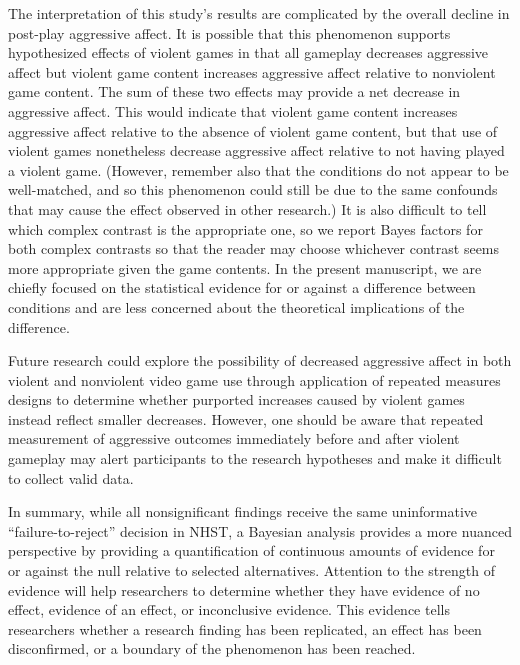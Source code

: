 \documentclass[man]{apa6}
\begin{document}

The interpretation of this study's results are complicated by the overall decline in post-play aggressive affect. It is possible that this phenomenon supports hypothesized effects of violent games in that all gameplay decreases aggressive affect but violent game content increases aggressive affect relative to nonviolent game content. The sum of these two effects may provide a net decrease in aggressive affect. This would indicate that violent game content increases aggressive affect relative to the absence of violent game content, but that use of violent games nonetheless decrease aggressive affect relative to not having played a violent game. (However, remember also that the conditions do not appear to be well-matched, and so this phenomenon could still be due to the same confounds that may cause the effect observed in other research.) It is also difficult to tell which complex contrast is the appropriate one, so we report Bayes factors for both complex contrasts so that the reader may choose whichever contrast seems more appropriate given the game contents. In the present manuscript, we are chiefly focused on the statistical evidence for or against a difference between conditions and are less concerned about the theoretical implications of the difference.

Future research could explore the possibility of decreased aggressive affect in both violent and nonviolent video game use through application of repeated measures designs to determine whether purported increases caused by violent games instead reflect smaller decreases. However, one should be aware that repeated measurement of aggressive outcomes immediately before and after violent gameplay may alert participants to the research hypotheses and make it difficult to collect valid data. 

In summary, while all nonsignificant findings receive the same uninformative ``failure-to-reject'' decision in NHST, a Bayesian analysis provides a more nuanced perspective by providing a quantification of continuous amounts of evidence for or against the null relative to selected alternatives. Attention to the strength of evidence will help researchers to determine whether they have evidence of no effect, evidence of an effect, or inconclusive evidence. This evidence tells researchers whether a research finding has been replicated, an effect has been disconfirmed, or a boundary of the phenomenon has been reached.
\end{document}
